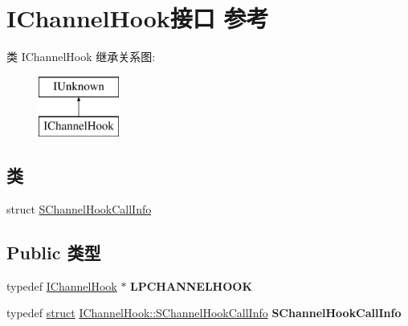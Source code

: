 \hypertarget{interface_i_channel_hook}{}\section{I\+Channel\+Hook接口 参考}
\label{interface_i_channel_hook}
类 I\+Channel\+Hook 继承关系图\+:\begin{figure}[H]
\begin{center}
\leavevmode
\includegraphics[height=2.000000cm]{interface_i_channel_hook}
\end{center}
\end{figure}
\subsection*{类}
\begin{DoxyCompactItemize}
\item 
struct \hyperlink{struct_i_channel_hook_1_1_s_channel_hook_call_info}{S\+Channel\+Hook\+Call\+Info}
\end{DoxyCompactItemize}
\subsection*{Public 类型}
\begin{DoxyCompactItemize}
\item 
\mbox{\label{interface_i_channel_hook_ac78ddd72e818dc3e2868d1b7427a31bc}} 
typedef \hyperlink{interface_i_channel_hook}{I\+Channel\+Hook} $\ast$ {\bfseries L\+P\+C\+H\+A\+N\+N\+E\+L\+H\+O\+OK}
\item 
\mbox{\label{interface_i_channel_hook_a91229fd7d45c95e03a68db7929669eda}} 
typedef \hyperlink{interfacestruct}{struct} \hyperlink{struct_i_channel_hook_1_1_s_channel_hook_call_info}{I\+Channel\+Hook\+::\+S\+Channel\+Hook\+Call\+Info} {\bfseries S\+Channel\+Hook\+Call\+Info}
\end{DoxyCompactItemize}
